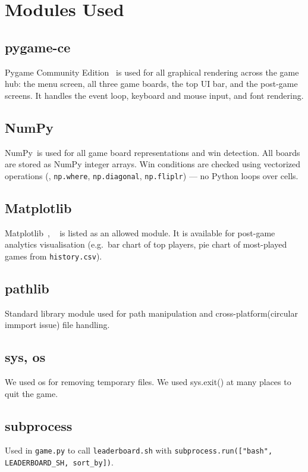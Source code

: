 \documentclass[12pt, letterpaper]{article}
\begin{document}
\section{Modules Used}

\subsection{pygame-ce}
Pygame Community Edition~\cite{pygame} is used for all graphical rendering
across the game hub: the menu screen, all three game boards, the top UI bar,
and the post-game screens. It handles the event loop, keyboard and mouse
input, and font rendering.

\subsection{NumPy}
NumPy~\cite{numpy}is used for all game board representations and win
detection. All boards are stored as NumPy integer arrays.
Win conditions are checked using vectorized operations
(, \texttt{np.where},
\texttt{np.diagonal}, \texttt{np.fliplr}) --- no Python loops over cells.

\subsection{Matplotlib}
Matplotlib~\cite{matplotlib}, ~\cite{matplotlib_formatters} is listed as an allowed module. It is available
for post-game analytics visualisation (e.g.\ bar chart of top players, pie
chart of most-played games from \texttt{history.csv}).

\subsection{pathlib}
Standard library module used for path manipulation and
cross-platform(circular immport issue) file handling.

\subsection{sys, os}
We used os for removing temporary files.
We used sys.exit() at many places to quit the game.

\subsection{subprocess}
Used in \texttt{game.py} to call \texttt{leaderboard.sh} with
\texttt{subprocess.run(["bash", LEADERBOARD\_SH, sort\_by])}.
\end{document}
